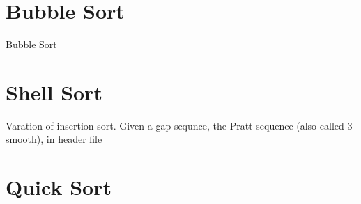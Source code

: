 \documentclass[12pt]{article}
\begin{document}
\section{Bubble Sort}

Bubble Sort

\section{Shell Sort}

Varation of insertion sort.
Given a gap sequnce, the Pratt sequence (also called 3-smooth), in header file
\section{Quick Sort}
\end{document}
